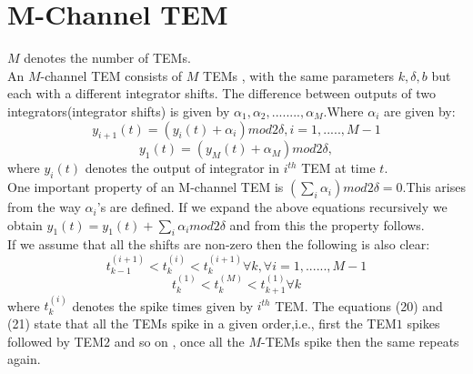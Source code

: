 \documentclass{article}
\begin{document}
\section{M-Channel TEM}
\textbf{$M$} denotes the number of TEMs.\\
An $M$-channel TEM consists of $M$ TEMs , with the same parameters $k,\delta,b$ but each with a different integrator shifts. The difference between outputs of two integrators(integrator shifts) is given by $\alpha_1,\alpha_2,........,\alpha_M$.Where $\alpha_i$ are given by:
\begin{equation}
    y_{i+1}(t) = ( y_i(t) + \alpha_i ) mod 2\delta, i = 1,.....,M-1
\end{equation}
\begin{equation}
    y_{1}(t) = ( y_M(t) + \alpha_M ) mod 2\delta ,
\end{equation}
where $y_i(t)$ denotes the output of integrator in $i^{th}$ TEM at time $t$.\\
One important property of an M-channel TEM is $(\sum_i\alpha_i)mod2\delta = 0$.This arises from the way $\alpha_i$'s are defined. If we expand the above equations recursively we obtain $y_1(t) = y_1(t) + \sum_i\alpha_imod2\delta$ and from this the property follows.\\
If we assume that all the shifts are non-zero then the following is also clear:
\begin{equation}
    t_{k-1}^{(i+1)} < t_k^{(i)} < t_k^{(i+1)} \forall k,\forall i = 1,......,M-1 
\end{equation}
\begin{equation}
    t_k^{(1)} < t_k^{(M)} < t_{k+1}^{(1)} \forall k
\end{equation}
where $t_k^{(i)}$ denotes the spike times given by $i^{th}$ TEM.
The equations (20) and (21) state that all the TEMs spike in a given order,i.e., first the TEM$1$ spikes followed by TEM$2$ and so on , once all the $M$-TEMs spike then the same repeats again.
\end{document}
